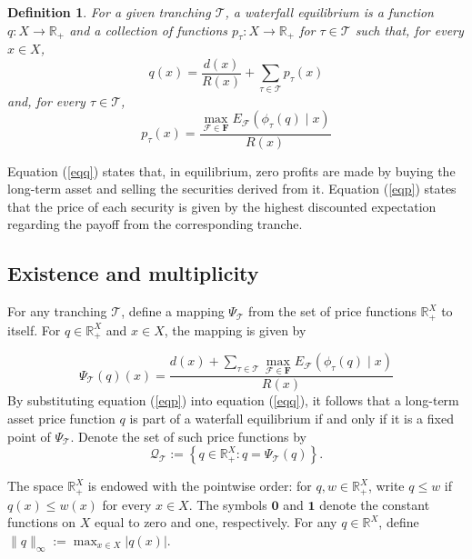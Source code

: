 \documentclass[11pt]{article}
\theoremstyle{plain}
\newtheorem{dfn}{Definition}%
\begin{document}
\begin{dfn} \label{def:core}
For a given tranching $\mathcal{T}$, a waterfall equilibrium is a function $q:X\to\mathbb{R}_+$ and a collection of functions $p_\tau:X\to\mathbb{R}_+$ for $\tau\in\mathcal{T}$ such that, for every $x\in X$,
\begin{equation}\label{eqq}
q(x)=\frac{d(x)}{R\left(x\right)}+\sum_{\tau\in\mathcal{T}}p_\tau(x)
\end{equation}
and, for every $\tau\in\mathcal{T}$,
\begin{equation}\label{eqp}
p_\tau(x)=\frac{\max_{\mathcal{F}\in\mathbf{F}}E_{\mathcal{F}}\left(\phi_\tau(q)\mid x\right)}{R(x)}
\end{equation}
\end{dfn}

Equation (\ref{eqq}) states that, in equilibrium, zero profits are made by buying the long-term asset and selling the securities derived from it. Equation (\ref{eqp}) states that the price of each security is given by the highest discounted expectation regarding the payoff from the corresponding tranche.

\subsection{Existence and multiplicity} \label{sec:extuni}

For any tranching $\mathcal{T}$, define a mapping $\Psi_\mathcal{T}$ from the set of price functions $\mathbb{R}_+^X$ to itself. For $q\in\mathbb{R}_+^X$ and $x\in X$, the mapping is given by

\begin{equation} \label{eq:map}
\Psi_{\mathcal{T}}(q)(x)=\frac{d(x)+\sum_{\tau\in\mathcal{T}}\max_{\mathcal{F}\in\mathbf{F}}E_{\mathcal{F}}\left(\phi_\tau(q)\mid x\right)}{R\left(x\right)}
\end{equation}
By substituting equation (\ref{eqp}) into equation (\ref{eqq}), it follows that a long-term asset price function $q$ is part of a waterfall equilibrium if and only if it is a fixed point of $\Psi_\mathcal{T}$. Denote the set of such price functions by
\[
\mathcal{Q}_{\mathcal{T}}
:=
\left\{q\in\mathbb{R}_+^X:q=\Psi_{\mathcal{T}}(q)\right\}.
\]

The space $\mathbb{R}_+^X$ is endowed with the pointwise order: for $q,w\in\mathbb{R}_+^X$, write $q\leq w$ if $q(x)\leq w(x)$ for every $x\in X$.
The symbols $\mathbf{0}$ and $\mathbf{1}$ denote the constant functions on $X$ equal to zero and one, respectively. For any $q\in\mathbb{R}^X$, define $\lVert q\rVert_\infty:=\max_{x\in X}|q(x)|$.
\end{document}
